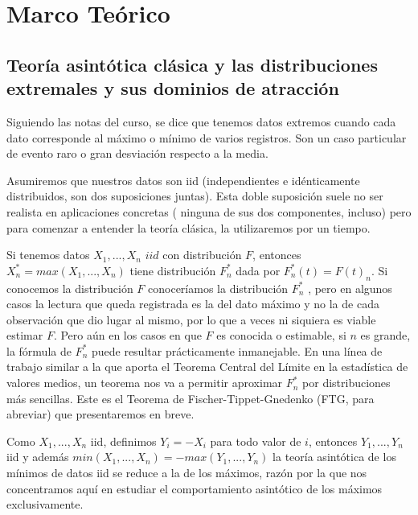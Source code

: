 \documentclass[
  12pt]{article}
\begin{document}
\hypertarget{marco-teuxf3rico}{%
\section{Marco Teórico}\label{marco-teuxf3rico}}

\hypertarget{teoruxeda-asintuxf3tica-cluxe1sica-y-las-distribuciones-extremales-y-sus-dominios-de-atracciuxf3n}{%
\subsection{Teoría asintótica clásica y las distribuciones extremales y
sus dominios de
atracción}\label{teoruxeda-asintuxf3tica-cluxe1sica-y-las-distribuciones-extremales-y-sus-dominios-de-atracciuxf3n}}

Siguiendo las notas del curso, se dice que tenemos datos extremos cuando
cada dato corresponde al máximo o mínimo de varios registros. Son un
caso particular de evento raro o gran desviación respecto a la media.

Asumiremos que nuestros datos son iid (independientes e idénticamente
distribuidos, son dos suposiciones juntas). Esta doble suposición suele
no ser realista en aplicaciones concretas ( ninguna de sus dos
componentes, incluso) pero para comenzar a entender la teoría clásica,
la utilizaremos por un tiempo.

Si tenemos datos \(X_1,...,X_n\) \(iid\) con distribución \(F\),
entonces \(X_n^* = max (X_1,...,X_n)\) tiene distribución \(F_n^*\) dada
por \(F_n^* (t)= F(t)_n\). Si conocemos la distribución \(F\)
conoceríamos la distribución \(F_n^*\) , pero en algunos casos la
lectura que queda registrada es la del dato máximo y no la de cada
observación que dio lugar al mismo, por lo que a veces ni siquiera es
viable estimar \(F\). Pero aún en los casos en que \(F\) es conocida o
estimable, si \(n\) es grande, la fórmula de \(F_n^*\) puede resultar
prácticamente inmanejable. En una línea de trabajo similar a la que
aporta el Teorema Central del Límite en la estadística de valores
medios, un teorema nos va a permitir aproximar \(F_n^*\) por
distribuciones más sencillas. Este es el Teorema de
Fischer-Tippet-Gnedenko (FTG, para abreviar) que presentaremos en breve.

Como \(X_1,...,X_n\) iid, definimos \(Y_i = -X_i\) para todo valor de
\(i\), entonces \(Y_1,...,Y_n\) iid y además
\(min(X_1,...,X_n) = - max(Y_1,...,Y_n)\) la teoría asintótica de los
mínimos de datos iid se reduce a la de los máximos, razón por la que nos
concentramos aquí en estudiar el comportamiento asintótico de los
máximos exclusivamente.
\end{document}
